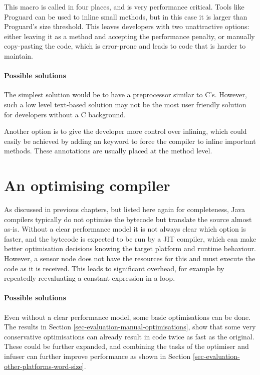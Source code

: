 This macro is called in four places, and is very performance critical. Tools like Proguard \cite{proguard} can be used to inline small methods, but in this case it is larger than Proguard's size threshold. This leaves developers with two unattractive options: either leaving it as a method and accepting the performance penalty, or manually copy-pasting the code, which is error-prone and leads to code that is harder to maintain.

\paragraph{Possible solutions}
The simplest solution would be to have a preprocessor similar to C's. However, such a low level text-based solution may not be the most user friendly solution for developers without a C background.

Another option is to give the developer more control over inlining, which could easily be achieved by adding an  keyword to force the compiler to inline important methods. These annotations are usually placed at the method level.




\section{An optimising compiler}
\label{sec-optimising-javac}
As discussed in previous chapters, but listed here again for completeness, Java compilers typically do not optimise the bytecode but translate the source almost as-is. Without a clear performance model it is not always clear which option is faster, and the bytecode is expected to be run by a JIT compiler, which can make better optimisation decisions knowing the target platform and runtime behaviour. However, a sensor node does not have the resources for this and must execute the code as it is received. This leads to significant overhead, for example by repeatedly reevaluating a constant expression in a loop.

\paragraph{Possible solutions}
Even without a clear performance model, some basic optimisations can be done. The results in Section \ref{sec-evaluation-manual-optimisations}, show that some very conservative optimisations can already result in code twice as fast as the original. These could be further expanded, and combining the tasks of the optimiser and infuser can further improve performance as shown in Section \ref{sec-evaluation-other-platforms-word-size}.




